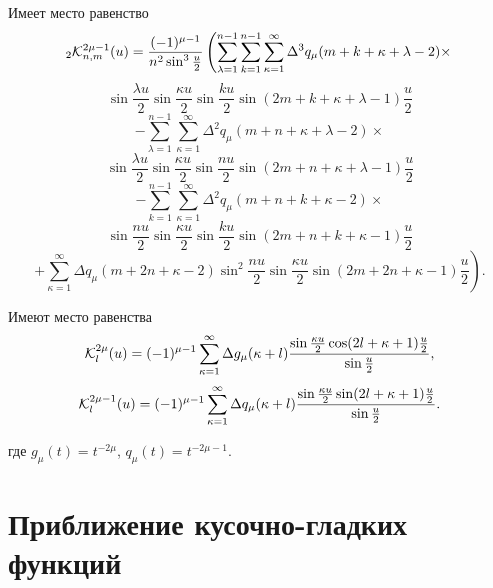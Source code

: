 \begin{lemma}\label{valle-pussen-l2.6}
Имеет место равенство
$$
_2\mathcal{ K}_{n,m}^{2\mu-1}(u)={(-1)^{\mu-1}\over n^2\sin^3\frac{u}{2}}\left(\sum\limits_{\lambda=1}^{n-1}\sum_{k=1}^{n-1}
\sum\limits_{\kappa=1}^{\infty}\Delta^3q_\mu(m+k+\kappa+\lambda-2)\times\right.
$$
$$
\sin\frac{\lambda u}{2}\sin\frac{\kappa u}{2}\sin\frac{ku}{2}\sin(2m+k+\kappa+\lambda-1)\frac{u}{2}
$$
$$
 -\sum\limits_{\lambda=1}^{n-1}
\sum\limits_{\kappa=1}^{\infty}\Delta^2q_\mu(m+n+\kappa+\lambda-2)\times
$$
$$
\sin\frac{\lambda u}{2}\sin\frac{\kappa u}{2}\sin\frac{nu}{2}\sin(2m+n+\kappa+\lambda-1)\frac{u}{2}
$$
$$
 -\sum_{k=1}^{n-1}
\sum\limits_{\kappa=1}^{\infty}\Delta^2q_\mu(m+n+k+\kappa-2)\times
$$
$$
\sin\frac{nu}{2}\sin\frac{\kappa u}{2}\sin\frac{ku}{2}\sin(2m+n+k+\kappa-1)\frac{u}{2}
$$
$$
 \left.+\sum\limits_{\kappa=1}^{\infty}\Delta q_\mu(m+2n+\kappa-2)
\sin^2\frac{nu}{2}\sin\frac{\kappa u}{2}\sin(2m+2n+\kappa-1)\frac{u}{2}\right).
$$
\end{lemma}

\begin{lemma}\label{valle-pussen-l2.7} Имеют место равенства
$$
\mathcal{ K}_l^{2\mu}(u)=
(-1)^{\mu-1}\sum_{\kappa=1}^{\infty}
\Delta g_\mu(\kappa+l){\sin\frac{\kappa u}{2}\cos(2l+\kappa+1)\frac{u}{2}\over\sin\frac{u}{2}},
$$
$$
\mathcal{ K}_l^{2\mu-1}(u)=
(-1)^{\mu-1}\sum_{\kappa=1}^{\infty}
\Delta q_\mu(\kappa+l){\sin\frac{\kappa u}{2}\sin(2l+\kappa+1)\frac{u}{2}\over\sin\frac{u}{2}}.
$$

где $g_\mu(t)=t^{-2\mu}$, $q_\mu(t)=t^{-2\mu-1}$.
\end{lemma}

\section{Приближение кусочно-гладких функций}\label{valle-pussen-ss3}


